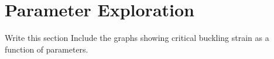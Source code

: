 \documentclass[10pt,twoside]{fernandes_supp}
\newcommand{\mf}[1]{\colorbox{blue!10}{\color{color3}#1}}
\begin{document}
\section{Parameter Exploration}
\mf{Write this section}
Include the graphs showing critical buckling strain as a function of parameters.


\nocite{aizenberg2005}
\nocite{deshpande2001}
\nocite{miserez2008}
\nocite{weaver2010}



% 
\end{document}
